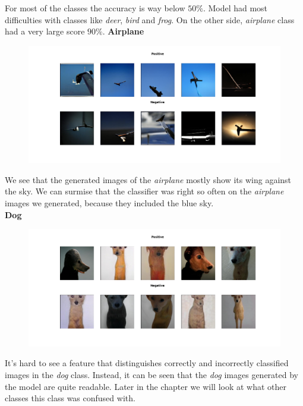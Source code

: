 \documentclass[12pt,a4paper,openany]{book}
\begin{document}
\noindent For most of the classes the accuracy is way below $50\%$. Model had most difficulties with classes like \textit{deer}, \textit{bird} and \textit{frog}. On the other side, \textit{airplane} class had a very large score $90\%$.
\newline
\noindent \textbf{Airplane}
\begin{figure}[ht!]
    \centering
    \includegraphics[scale=0.40]{figs/cifar10_examples/airplane.png}
\end{figure} 
\newline
\noindent We see that the generated images of the \textit{airplane} mostly show its wing against the sky. We can surmise that the classifier was right so often on the \textit{airplane} images we generated, because they included the blue sky. \\
\newline
\noindent \textbf{Dog} \\
\begin{figure}[ht!]
    \centering
    \includegraphics[scale=0.40]{figs/cifar10_examples/dog.png}
\end{figure}
\newline It's hard to see a feature that distinguishes correctly and incorrectly classified images in the \textit{dog} class. Instead, it can be seen that the \textit{dog} images generated by the model are quite readable. Later in the chapter we will look at what other classes this class was confused with.
\end{document}
